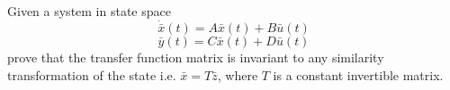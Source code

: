 \item Given a system in state space
  \begin{equation}
    \dot {\bar x}(t) = A\bar x(t) + B\bar u(t)
  \end{equation}
  \begin{equation}
    \bar y(t) = C\bar x(t) + D\bar u(t)
  \end{equation}
  prove that the transfer function matrix is invariant to any similarity transformation of the state i.e.
  $\bar x = T\bar z$, where $T$ is a constant invertible matrix.